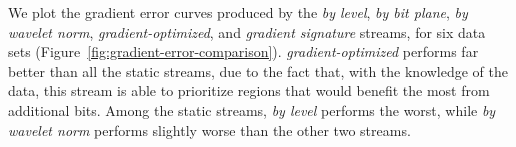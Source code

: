 We plot the gradient error curves produced by the \emph{by level}, \emph{by bit plane}, \emph{by
wavelet norm}, \emph{gradient-optimized}, and \emph{gradient signature} streams, for six data sets
(Figure~\ref{fig:gradient-error-comparison}). \emph{gradient-optimized} performs far better than all
the static streams, due to the fact that, with the knowledge of the data, this stream is able to
prioritize regions that would benefit the most from additional bits. Among the static streams,
\emph{by level} performs the worst, while \emph{by wavelet norm} performs slightly worse than the
other two streams. 

\begin{figure}[h]
	\centering

\end{figure}
